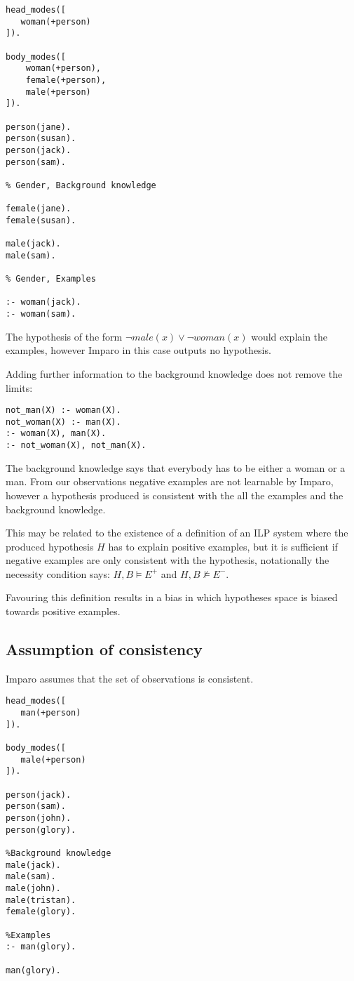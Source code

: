 \begin{lstlisting}
head_modes([
   woman(+person)
]).

body_modes([
    woman(+person),
    female(+person),
    male(+person)
]).

person(jane).
person(susan).
person(jack).
person(sam).

% Gender, Background knowledge

female(jane).
female(susan).

male(jack).
male(sam).

% Gender, Examples

:- woman(jack).
:- woman(sam).
\end{lstlisting}

The hypothesis of the form $\neg male(x) \vee \neg woman(x)$ would explain the examples, however Imparo in this case outputs no hypothesis.

Adding further information to the background knowledge does not remove the limits:

\begin{lstlisting}
not_man(X) :- woman(X).
not_woman(X) :- man(X).
:- woman(X), man(X).
:- not_woman(X), not_man(X).
\end{lstlisting}
The background knowledge says that everybody has to be either a woman or a man. From our observations negative examples are not learnable by Imparo, however a hypothesis produced is consistent with the all the examples and the background knowledge.

This may be related to the existence of a definition of an ILP system where the produced hypothesis $H$ has to explain positive examples, but it is sufficient if negative examples are only consistent with the hypothesis, notationally the necessity condition says:
$H, B \models E^+$ and $H, B \not \models E^-$.

Favouring this definition results in a bias in which hypotheses space is biased towards positive examples.

\subsection{Assumption of consistency}
Imparo assumes that the set of observations is consistent.

\begin{lstlisting}
head_modes([
   man(+person)
]).

body_modes([
   male(+person)
]).

person(jack).
person(sam).
person(john).
person(glory).

%Background knowledge
male(jack).
male(sam).
male(john).
male(tristan).
female(glory).

%Examples
:- man(glory).

man(glory).
\end{lstlisting}

